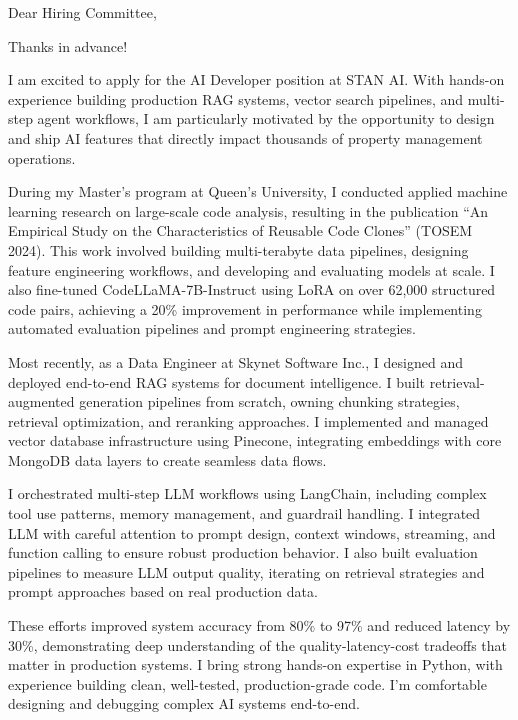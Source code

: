 \documentclass[12pt,a4paper,roman]{moderncv}
\def \position {AI Developer}
\def \company {STAN AI}
\begin{document}
\recipient{RE:}{\position{} @ \company \\ } %
\date{\today}
\opening{Dear Hiring Committee, }
\closing{Thanks in advance!}
\makelettertitle

\begin{justify}

I am excited to apply for the AI Developer position at STAN AI. With hands-on experience building production RAG systems, vector search pipelines, and multi-step agent workflows, I am particularly motivated by the opportunity to design and ship AI features that directly impact thousands of property management operations.

During my Master's program at Queen's University, I conducted applied machine learning research on large-scale code analysis, resulting in the publication “An Empirical Study on the Characteristics of Reusable Code Clones” (TOSEM 2024). This work involved building multi-terabyte data pipelines, designing feature engineering workflows, and developing and evaluating models at scale. I also fine-tuned CodeLLaMA-7B-Instruct using LoRA on over 62,000 structured code pairs, achieving a 20\% improvement in performance while implementing automated evaluation pipelines and prompt engineering strategies.

Most recently, as a Data Engineer at Skynet Software Inc., I designed and deployed end-to-end RAG systems for document intelligence. I built retrieval-augmented generation pipelines from scratch, owning chunking strategies, retrieval optimization, and reranking approaches. I implemented and managed vector database infrastructure using Pinecone, integrating embeddings with core MongoDB data layers to create seamless data flows.

I orchestrated multi-step LLM workflows using LangChain, including complex tool use patterns, memory management, and guardrail handling. I integrated LLM with careful attention to prompt design, context windows, streaming, and function calling to ensure robust production behavior. I also built evaluation pipelines to measure LLM output quality, iterating on retrieval strategies and prompt approaches based on real production data.

These efforts improved system accuracy from 80\% to 97\% and reduced latency by 30\%, demonstrating deep understanding of the quality-latency-cost tradeoffs that matter in production systems. I bring strong hands-on expertise in Python, with experience building clean, well-tested, production-grade code. I'm comfortable designing and debugging complex AI systems end-to-end.


\end{justify}
\end{document}

